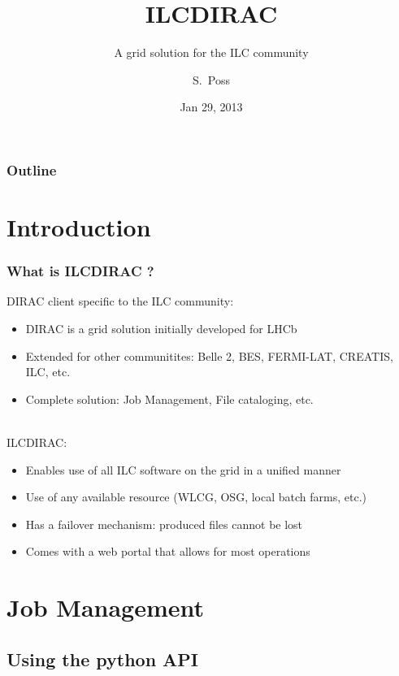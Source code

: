 \documentclass[10pt,table,dvipsnames]{beamer}
\author{S.~Poss}
\title{ILCDIRAC}
\subtitle{A grid solution for the ILC community}
\date{Jan 29, 2013}
\begin{document}
\begin{frame}
\titlepage
\end{frame}

\begin{frame}
\frametitle{Outline}
\tableofcontents
\end{frame}

\section{Introduction}\label{sec:intro}
\begin{frame}
  \frametitle{What is ILCDIRAC ?}
DIRAC client specific to the ILC community:
\begin{itemize}
\item DIRAC is a grid solution initially developed for LHCb
\item Extended for other communitites: Belle 2, BES, FERMI-LAT,
  CREATIS, ILC, etc.
\item Complete solution: Job Management, File cataloging, etc.
\end{itemize}
~\\
ILCDIRAC:
\begin{itemize}
\item Enables use of \alert{all ILC software} on the grid in a unified manner
\item Use of \alert{any} available resource (WLCG, OSG, local batch farms,
  etc.)
\item Has a failover mechanism: \alert{produced files cannot be lost}
\item Comes with a web portal that allows for most operations
\end{itemize}
\end{frame}

\section{Job Management}
\label{sec:jobman}

\subsection{Using the python API}
\label{sec:api}
\end{document}
